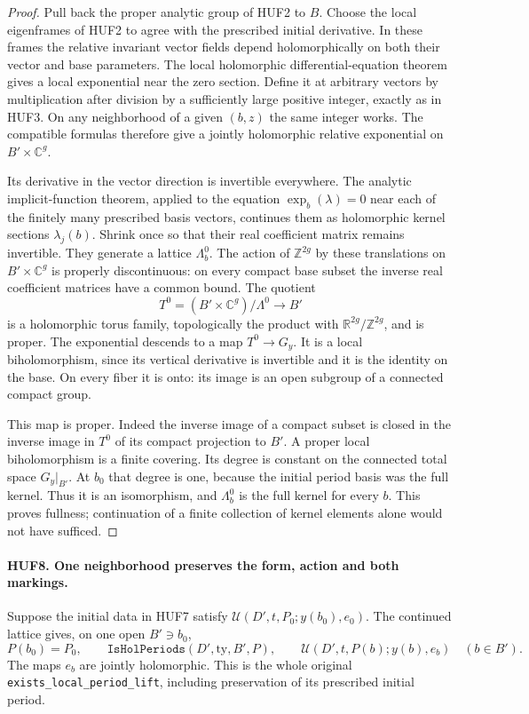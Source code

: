 \begin{proof}
Pull back the proper analytic group of HUF2 to \(B\).
Choose the local eigenframes of HUF2 to agree with the
prescribed initial derivative.  In these frames the
relative invariant vector fields depend holomorphically
on both their vector and base parameters.  The local
holomorphic differential-equation theorem gives a local
exponential near the zero section.  Define it at arbitrary
vectors by multiplication after division by a sufficiently
large positive integer, exactly as in HUF3.  On any
neighborhood of a given \((b,z)\) the same integer works.
The compatible formulas therefore give a jointly
holomorphic relative exponential on \(B'\times\mathbb C^g\).

Its derivative in the vector direction is invertible
everywhere.  The analytic implicit-function theorem,
applied to the equation \(\exp_b(\lambda)=0\) near each
of the finitely many prescribed basis vectors, continues
them as holomorphic kernel sections \(\lambda_j(b)\).
Shrink once so that their real coefficient matrix remains
invertible.  They generate a lattice \(\Lambda_b^0\).
The action of \(\mathbb Z^{2g}\) by these translations
on \(B'\times\mathbb C^g\) is properly discontinuous:
on every compact base subset the inverse real coefficient
matrices have a common bound.  The quotient
\[
       T^0=(B'\times\mathbb C^g)/\Lambda^0
                         \longrightarrow B'
\]
is a holomorphic torus family, topologically the product
with \(\mathbb R^{2g}/\mathbb Z^{2g}\), and is proper.
The exponential descends to a map \(T^0\to G_y\).
It is a local biholomorphism, since its vertical derivative
is invertible and it is the identity on the base.
On every fiber it is onto: its image is an open subgroup
of a connected compact group.

This map is proper.  Indeed the inverse image of a
compact subset is closed in the inverse image in \(T^0\)
of its compact projection to \(B'\).  A proper local
biholomorphism is a finite covering.  Its degree is
constant on the connected total space \(G_y|_{B'}\).
At \(b_0\) that degree is one, because the initial
period basis was the full kernel.  Thus it is an
isomorphism, and \(\Lambda_b^0\) is the full kernel
for every \(b\).  This proves fullness; continuation
of a finite collection of kernel elements alone would
not have sufficed.
\end{proof}

\paragraph{HUF8. One neighborhood preserves the form, action and both markings.}
\label{claim:HUF8}
Suppose the initial data in HUF7 satisfy
\(\mathcal U(D',t,P_0;y(b_0),e_0)\).
The continued lattice gives, on one open \(B'\ni b_0\),
\[
 P(b_0)=P_0,\qquad \texttt{IsHolPeriods}(D',\mathrm{ty},B',P),
 \qquad
 \mathcal U(D',t,P(b);y(b),e_b)\quad(b\in B').
 \tag{HUF.7}
\]
The maps \(e_b\) are jointly holomorphic.  This is the
whole original \texttt{exists\_local\_period\_lift}, including
preservation of its prescribed initial period.

